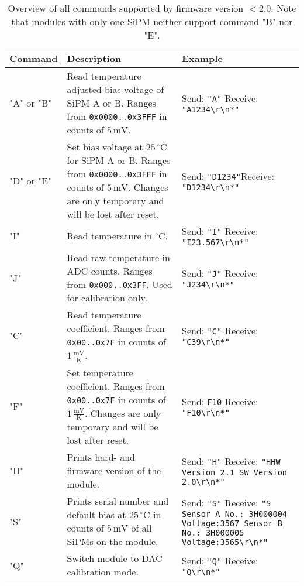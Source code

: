 \documentclass[]{article}
\begin{document}
	\begin{table}
		\begin{center}
			\begin{tabular}[]{|l||p{6cm}|p{4cm}|}
			\hline
			Command & Description & Example \\
			\hline
			"A" or "B" & Read temperature adjusted bias voltage of SiPM A or B. Ranges from \verb|0x0000..0x3FFF| in counts of $5\,\text{mV}$. & Send: \verb|"A"|
			\newline Receive: \verb|"A1234\r\n*"|\\
			\hline
			"D" or "E" & Set bias voltage at $25\,^{\circ} \text{C}$ for SiPM A or B. Ranges from \verb|0x0000..0x3FFF| in counts of $5\,\text{mV}$. Changes are only temporary and will be lost after reset.& Send: \verb|"D1234"|\newline Receive: \verb|"D1234\r\n*"|\\
			\hline
			"I" & Read temperature in $^{\circ}\text{C}$. & Send: \verb|"I"| \newline Receive: \verb|"I23.567\r\n*"| \\
			\hline
			"J" & Read raw temperature in ADC counts. Ranges from \verb|0x000..0x3FF|. Used for calibration only. & Send: \verb|"J"| \newline Receive: \verb|"J234\r\n*"|\\
			\hline
			"C" & Read temperature coefficient. Ranges from \verb|0x00..0x7F| in counts of $1\,\frac{\text{mV}}{\text{K}}$. & Send: \verb|"C"| 
			\newline Receive: \verb|"C39\r\n*"| \\
			\hline
			"F" & Set temperature coefficient. Ranges from \verb|0x00..0x7F| in counts of $1\,\frac{\text{mV}}{\text{K}}$. Changes are only temporary and 
			will be lost after reset. & Send: \verb|F10| \newline Receive: \verb|"F10\r\n*"| \\
			\hline
			"H" & Prints hard- and firmware version of the module. & Send: \verb|"H"| \newline Receive: \verb|"HHW Version 2.1 SW Version 2.0\r\n*"| \\
			\hline
			"S" & Prints serial number and default bias at $25\,^{\circ} \text{C}$ in counts of $5\, \text{mV}$ of all SiPMs on the module. &  Send: \verb|"S"| 
			\newline Receive: \verb|"S Sensor A No.: 3H000004 Voltage:3567 Sensor B No.: 3H000005 Voltage:3565\r\n*"| \\
			\hline
			"Q" & Switch module to DAC calibration mode. & Send: \verb|"Q"| \newline Receive: \verb|"Q\r\n*"| \\
			\hline
			\end{tabular}
		\end{center}
		\caption{Overview of all commands supported by firmware version $<2.0$. Note that modules with only one SiPM neither support command "B" nor "E".}
		\label{sipm_bus_table}
	\end{table}	
\end{document}
